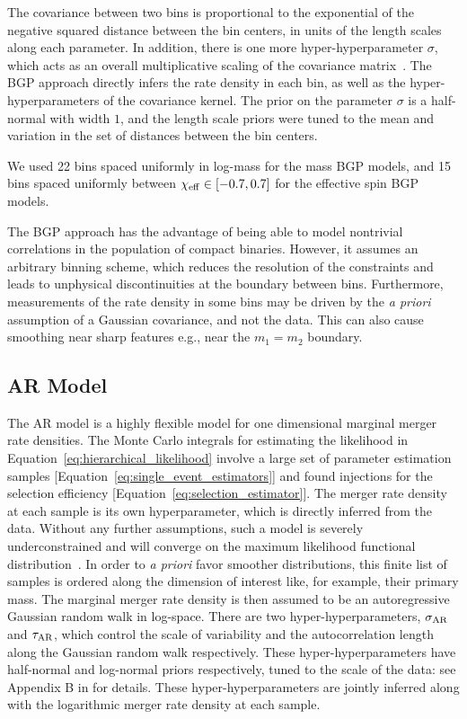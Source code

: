 The covariance between two bins is proportional to the exponential of the negative squared distance between the bin centers, in units of the length scales along each parameter.
In addition, there is one more hyper-hyperparameter $\sigma$, which acts as an overall multiplicative scaling of the covariance matrix~\citep{Ray:2023upk}.
The \ac{BGP} approach directly infers the rate density in each bin, as well as the hyper-hyperparameters of the covariance kernel.
The prior on the parameter $\sigma$ is a half-normal with width $1$, and the length scale priors were tuned to the mean and variation in the set of distances between the bin centers.

We used 22 bins spaced uniformly in log-mass for the mass \ac{BGP} models, and 15 bins spaced uniformly between $\chi_{\rm eff} \in [-0.7,0.7]$ for the effective spin \ac{BGP} models.

The \ac{BGP} approach has the advantage of being able to model nontrivial correlations in the population of compact binaries. 
However, it assumes an arbitrary binning scheme, which reduces the resolution of the constraints and leads to unphysical discontinuities at the boundary between bins.
Furthermore, measurements of the rate density in some bins may be driven by the \textit{a priori} assumption of a Gaussian covariance, and not the data. This can also cause smoothing near sharp features e.g., near the $m_1=m_2$ boundary.

\subsection{\acf{AR} Model}

The \ac{AR} model \citep{Callister:2023tgi} is a highly flexible model for one dimensional marginal merger rate densities. 
The Monte Carlo integrals for estimating the likelihood in Equation~\eqref{eq:hierarchical_likelihood} involve a large set of parameter estimation samples [Equation~\eqref{eq:single_event_estimators}] and found injections for the selection efficiency [Equation~\eqref{eq:selection_estimator}].
The merger rate density at each sample is its own hyperparameter, which is directly inferred from the data. 
Without any further assumptions, such a model is severely underconstrained and will converge on the maximum likelihood functional distribution~\citep{Payne:2022xan}.
In order to \textit{a priori} favor smoother distributions, this finite list of samples is ordered along the dimension of interest like, for example, their primary mass. 
The marginal merger rate density is then assumed to be an autoregressive Gaussian random walk in log-space.
There are two hyper-hyperparameters, $\sigma_{\rm AR}$ and $\tau_{\rm AR}$, which control the scale of variability and the autocorrelation length along the Gaussian random walk respectively.
These hyper-hyperparameters have half-normal and log-normal priors respectively, tuned to the scale of the data: see Appendix B in \cite{Callister:2023tgi} for details. These hyper-hyperparameters are jointly inferred along with the logarithmic merger rate density at each sample.

